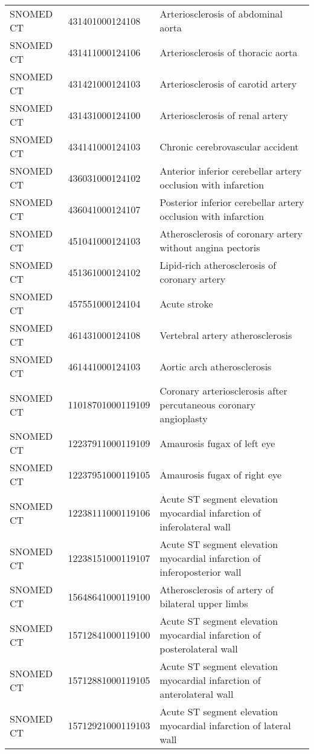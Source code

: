 \begin{longtable}{p{}p{}p{}}
  SNOMED CT & 431401000124108 & Arteriosclerosis of abdominal aorta \\ 
  SNOMED CT & 431411000124106 & Arteriosclerosis of thoracic aorta \\ 
  SNOMED CT & 431421000124103 & Arteriosclerosis of carotid artery \\ 
  SNOMED CT & 431431000124100 & Arteriosclerosis of renal artery \\ 
  SNOMED CT & 434141000124103 & Chronic cerebrovascular accident \\ 
  SNOMED CT & 436031000124102 & Anterior inferior cerebellar artery occlusion with infarction \\ 
  SNOMED CT & 436041000124107 & Posterior inferior cerebellar artery occlusion with infarction \\ 
  SNOMED CT & 451041000124103 & Atherosclerosis of coronary artery without angina pectoris \\ 
  SNOMED CT & 451361000124102 & Lipid-rich atherosclerosis of coronary artery \\ 
  SNOMED CT & 457551000124104 & Acute stroke \\ 
  SNOMED CT & 461431000124108 & Vertebral artery atherosclerosis \\ 
  SNOMED CT & 461441000124103 & Aortic arch atherosclerosis \\ 
  SNOMED CT & 11018701000119109 & Coronary arteriosclerosis after percutaneous coronary angioplasty \\ 
  SNOMED CT & 12237911000119109 & Amaurosis fugax of left eye \\ 
  SNOMED CT & 12237951000119105 & Amaurosis fugax of right eye \\ 
  SNOMED CT & 12238111000119106 & Acute ST segment elevation myocardial infarction of inferolateral wall \\ 
  SNOMED CT & 12238151000119107 & Acute ST segment elevation myocardial infarction of inferoposterior wall \\ 
  SNOMED CT & 15648641000119100 & Atherosclerosis of artery of bilateral upper limbs \\ 
  SNOMED CT & 15712841000119100 & Acute ST segment elevation myocardial infarction of posterolateral wall \\ 
  SNOMED CT & 15712881000119105 & Acute ST segment elevation myocardial infarction of anterolateral wall \\ 
  SNOMED CT & 15712921000119103 & Acute ST segment elevation myocardial infarction of lateral wall \\ 

\end{longtable}

